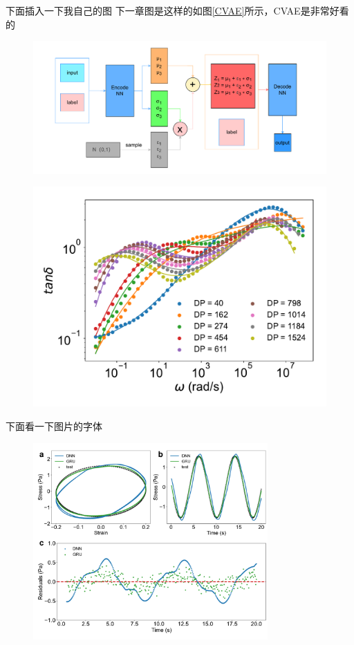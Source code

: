 下面插入一下我自己的图
下一章图是这样的如图\ref{CVAE}所示，CVAE是非常好看的
\begin{figure}[htbp]
	\centering
	\includegraphics[width=\textwidth]{Fig/CVAE示意图.drawio.pdf}
\end{figure}
\begin{figure}[htbp]
	\centering
	\includegraphics[width=\textwidth]{Fig/LF_lossF.pdf}
\end{figure}

下面看一下图片的字体
\begin{figure}[htbp]
	\centering
	\includegraphics[width=0.8\textwidth]{Fig/Maxwell_sin_.pdf}
\end{figure}

